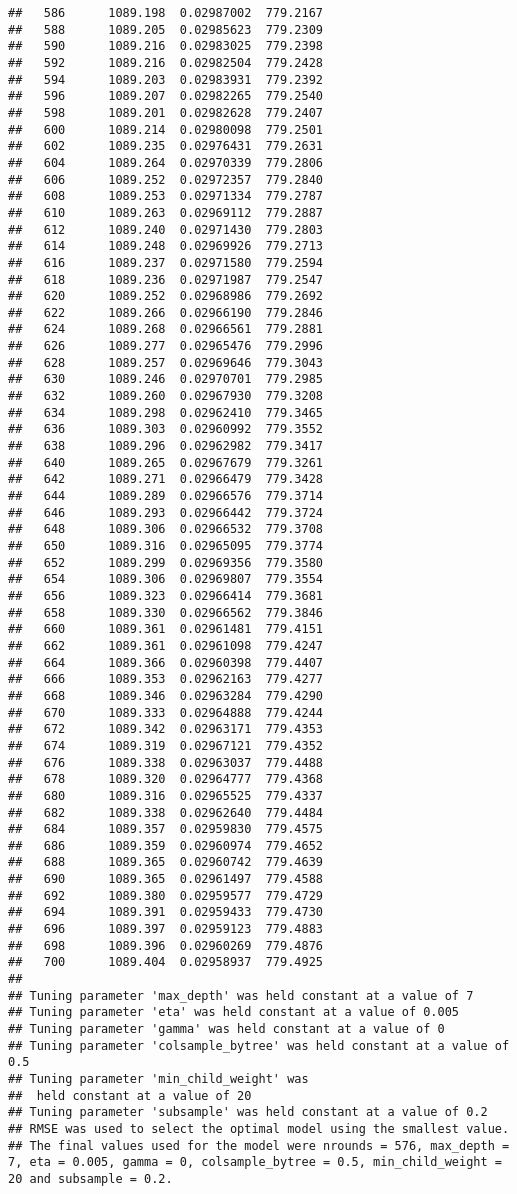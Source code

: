 \documentclass[
]{article}
\begin{document}
\begin{verbatim}
##   586      1089.198  0.02987002  779.2167
##   588      1089.205  0.02985623  779.2309
##   590      1089.216  0.02983025  779.2398
##   592      1089.216  0.02982504  779.2428
##   594      1089.203  0.02983931  779.2392
##   596      1089.207  0.02982265  779.2540
##   598      1089.201  0.02982628  779.2407
##   600      1089.214  0.02980098  779.2501
##   602      1089.235  0.02976431  779.2631
##   604      1089.264  0.02970339  779.2806
##   606      1089.252  0.02972357  779.2840
##   608      1089.253  0.02971334  779.2787
##   610      1089.263  0.02969112  779.2887
##   612      1089.240  0.02971430  779.2803
##   614      1089.248  0.02969926  779.2713
##   616      1089.237  0.02971580  779.2594
##   618      1089.236  0.02971987  779.2547
##   620      1089.252  0.02968986  779.2692
##   622      1089.266  0.02966190  779.2846
##   624      1089.268  0.02966561  779.2881
##   626      1089.277  0.02965476  779.2996
##   628      1089.257  0.02969646  779.3043
##   630      1089.246  0.02970701  779.2985
##   632      1089.260  0.02967930  779.3208
##   634      1089.298  0.02962410  779.3465
##   636      1089.303  0.02960992  779.3552
##   638      1089.296  0.02962982  779.3417
##   640      1089.265  0.02967679  779.3261
##   642      1089.271  0.02966479  779.3428
##   644      1089.289  0.02966576  779.3714
##   646      1089.293  0.02966442  779.3724
##   648      1089.306  0.02966532  779.3708
##   650      1089.316  0.02965095  779.3774
##   652      1089.299  0.02969356  779.3580
##   654      1089.306  0.02969807  779.3554
##   656      1089.323  0.02966414  779.3681
##   658      1089.330  0.02966562  779.3846
##   660      1089.361  0.02961481  779.4151
##   662      1089.361  0.02961098  779.4247
##   664      1089.366  0.02960398  779.4407
##   666      1089.353  0.02962163  779.4277
##   668      1089.346  0.02963284  779.4290
##   670      1089.333  0.02964888  779.4244
##   672      1089.342  0.02963171  779.4353
##   674      1089.319  0.02967121  779.4352
##   676      1089.338  0.02963037  779.4488
##   678      1089.320  0.02964777  779.4368
##   680      1089.316  0.02965525  779.4337
##   682      1089.338  0.02962640  779.4484
##   684      1089.357  0.02959830  779.4575
##   686      1089.359  0.02960974  779.4652
##   688      1089.365  0.02960742  779.4639
##   690      1089.365  0.02961497  779.4588
##   692      1089.380  0.02959577  779.4729
##   694      1089.391  0.02959433  779.4730
##   696      1089.397  0.02959123  779.4883
##   698      1089.396  0.02960269  779.4876
##   700      1089.404  0.02958937  779.4925
## 
## Tuning parameter 'max_depth' was held constant at a value of 7
## Tuning parameter 'eta' was held constant at a value of 0.005
## Tuning parameter 'gamma' was held constant at a value of 0
## Tuning parameter 'colsample_bytree' was held constant at a value of 0.5
## Tuning parameter 'min_child_weight' was
##  held constant at a value of 20
## Tuning parameter 'subsample' was held constant at a value of 0.2
## RMSE was used to select the optimal model using the smallest value.
## The final values used for the model were nrounds = 576, max_depth = 7, eta = 0.005, gamma = 0, colsample_bytree = 0.5, min_child_weight = 20 and subsample = 0.2.
\end{verbatim}
\end{document}
